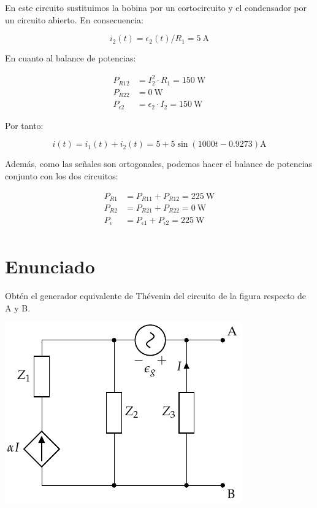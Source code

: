 En este circuito sustituimos la bobina por un cortocircuito y el condensador por un circuito abierto. En consecuencia:

\begin{equation*}
  i_2(t) = \epsilon_2(t) / R_1 = \qty{5}{\ampere}
\end{equation*}

En cuanto al balance de potencias:

\begin{align*}
  P_{R12} &= I_2^2 \cdot R_1 = \qty{150}{\watt}\\
  P_{R22} &= \qty{0}{\watt}\\
  P_{\epsilon2} &= \epsilon_2 \cdot I_2 = \qty{150}{\watt}
\end{align*}

Por tanto:

\begin{equation*}
  i(t) = i_1(t) + i_2(t) = 5 + 5\sin(1000t - 0.9273)\si{\ampere}
\end{equation*}

Además, como las señales son ortogonales, podemos hacer el balance de potencias conjunto con los dos circuitos:

\begin{align*}
  P_{R1} &= P_{R11} + P_{R12} = \qty{225}{\watt}\\
  P_{R2} &= P_{R21} + P_{R22} = \qty{0}{\watt}\\
  P_{\epsilon} &= P_{\epsilon1} + P_{\epsilon2} = \qty{225}{\watt}\\
\end{align*}

\section{Enunciado}
Obtén el generador equivalente de Thévenin del circuito de la figura respecto de A y B.

\begin{center}
\includegraphics{figuras/Thevenin4}
\end{center}

